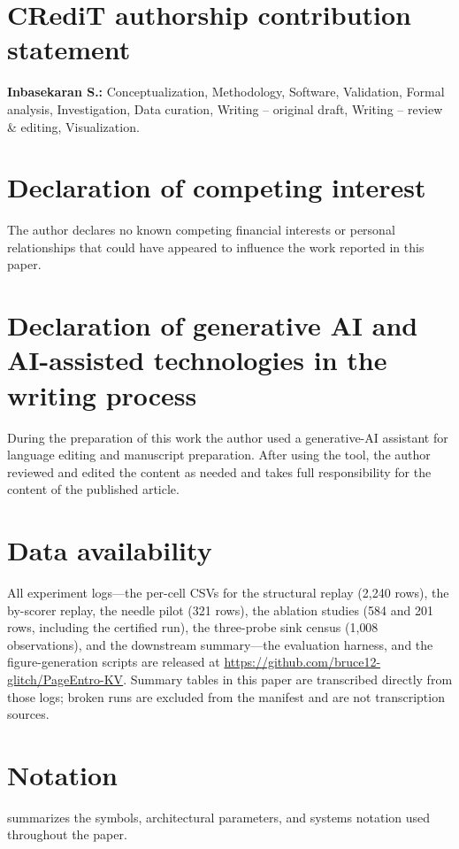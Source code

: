 \documentclass[final,5p,times,twocolumn]{elsarticle}
\theoremstyle{definition}
\theoremstyle{remark}
\begin{document}
\section*{CRediT authorship contribution statement}
\textbf{Inbasekaran S.:} Conceptualization, Methodology, Software,
Validation, Formal analysis, Investigation, Data curation, Writing --
original draft, Writing -- review \& editing, Visualization.

\section*{Declaration of competing interest}
The author declares no known competing financial interests or personal
relationships that could have appeared to influence the work reported in
this paper.

\section*{Declaration of generative AI and AI-assisted technologies
in the writing process}
During the preparation of this work the author used a generative-AI
assistant for language editing and manuscript preparation. After using
the tool, the author reviewed and edited the content as needed and
takes full responsibility for the content of the published article.

\section*{Data availability}
All experiment logs---the per-cell CSVs for the structural replay
(2{,}240 rows), the by-scorer replay, the needle pilot (321 rows), the
ablation studies (584 and 201 rows, including the certified run), the
three-probe sink census (1{,}008 observations), and the downstream
summary---the evaluation harness, and the figure-generation scripts are
released at \url{https://github.com/bruce12-glitch/PageEntro-KV}.
Summary tables in this paper are transcribed directly from those logs;
broken runs are excluded from the manifest and are not transcription
sources.

\appendix

\section{Notation}
\label{app:notation}

 summarizes the symbols, architectural parameters,
and systems notation used throughout the paper.
\end{document}
